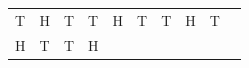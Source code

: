 {\begin{tabular}[t]{|l|l|l|l|l|l|l|l|l|l|}
        T &
        H &
        T &
        T &
        H &
        T &
        T &
        H &
        T%
     \tabularnewline\cline{1-1}\cline{2-2}\cline{3-3}\cline{4-4}\cline{5-5}\cline{6-6}\cline{7-7}\cline{8-8}\cline{9-9}\cline{10-10}
        H &
        T &
        T &
        H &

\end{tabular}}
